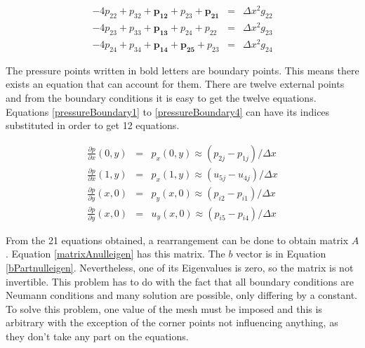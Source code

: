 \documentclass[journal]{IEEEtran}
\begin{document}
\begin{eqnarray}
-4p_{22} + p_{32} + \boldsymbol{p_{12}} + p_{23} + \boldsymbol{p_{21}} &=& \Delta x^2 g_{22} \label{internalPoissonEq1}\\
-4p_{23} + p_{33} + \boldsymbol{p_{13}} + p_{24} + p_{22} &=& \Delta x^2 g_{23}\label{internalPoissonEq2}\\
-4p_{24} + p_{34} + \boldsymbol{p_{14}} + \boldsymbol{p_{25}} + p_{23} &=& \Delta x^2 g_{24}\label{internalPoissonEq3}
\end{eqnarray}

The pressure points written in bold letters are boundary points. This means there exists an equation that can account for them. There are twelve external points and from the boundary conditions it is easy to get the twelve equations. Equations \ref{pressureBoundary1} to \ref{pressureBoundary4} can have its indices substituted in order to get 12 equations.

\begin{eqnarray}
\frac{\partial p}{\partial x}\left(0, y\right) &=& p_x\left(0, y\right)  \approx  (p_{2j} - p_{1j})/\Delta x \label{pressureBoundary1}\\
\frac{\partial p}{\partial x}\left(1, y\right) &=& p_x\left(1, y\right)  \approx  (u_{5j} - u_{4j})/\Delta x\\
\frac{\partial p}{\partial y}\left(x, 0\right) &=& p_y\left(x, 0\right)  \approx (p_{i2} - p_{i1})/\Delta x\\
\frac{\partial p}{\partial y}\left(x, 0\right) &=& u_y\left(x, 0\right)  \approx  (p_{i5} - p_{i4})/\Delta x\label{pressureBoundary4}
\end{eqnarray}

From the 21 equations obtained, a rearrangement can be done to obtain matrix $A$. Equation \ref{matrixAnulleigen} has this matrix. The $b$ vector is in Equation \ref{bPartnulleigen}. Nevertheless, one of its Eigenvalues is zero, so the matrix is not invertible. This problem has to do with the fact that all boundary conditions are Neumann conditions and many solution are possible, only differing by a constant. To solve this problem, one value of the mesh must be imposed and this is arbitrary with the exception of the corner points not influencing anything, as they don't take any part on the equations. 
\end{document}
